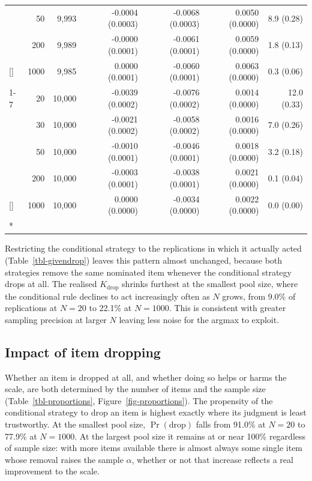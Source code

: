 \documentclass[
  nonatbib,
  authoryear,
  preprint]{elsarticle}
\begin{document}
\begin{longtable}[t]{lrrrrrr}
\nopagebreak
 & 50 & 9,993 & -0.0004 (0.0003) & -0.0068 (0.0003) & 0.0050 (0.0000) & 8.9 (0.28)\\
\nopagebreak
 & 200 & 9,989 & -0.0000 (0.0001) & -0.0061 (0.0001) & 0.0059 (0.0000) & 1.8 (0.13)\\
\nopagebreak
\multirow[t]{-4}{*}[\normalbaselineskip]{\raggedright\arraybackslash 20} & 1000 & 9,985 & 0.0000 (0.0001) & -0.0060 (0.0001) & 0.0063 (0.0000) & 0.3 (0.06)\\
\cmidrule{1-7}\pagebreak[0]
 & 20 & 10,000 & -0.0039 (0.0002) & -0.0076 (0.0002) & 0.0014 (0.0000) & 12.0 (0.33)\\
\nopagebreak
 & 30 & 10,000 & -0.0021 (0.0002) & -0.0058 (0.0002) & 0.0016 (0.0000) & 7.0 (0.26)\\
\nopagebreak
 & 50 & 10,000 & -0.0010 (0.0001) & -0.0046 (0.0001) & 0.0018 (0.0000) & 3.2 (0.18)\\
\nopagebreak
 & 200 & 10,000 & -0.0003 (0.0001) & -0.0038 (0.0001) & 0.0021 (0.0000) & 0.1 (0.04)\\
\nopagebreak
\multirow[t]{-4}{*}[\normalbaselineskip]{\raggedright\arraybackslash 40} & 1000 & 10,000 & 0.0000 (0.0000) & -0.0034 (0.0000) & 0.0022 (0.0000) & 0.0 (0.00)\\*

\end{longtable}

\endgroup{}

Restricting the conditional strategy to the replications in which it
actually acted (Table~\ref{tbl-givendrop}) leaves this pattern almost
unchanged, because both strategies remove the same nominated item
whenever the conditional strategy drops at all. The realised
\(K_{\text{drop}}\) shrinks furthest at the smallest pool size, where
the conditional rule declines to act increasingly often as \(N\) grows,
from 9.0\% of replications at \(N = 20\) to 22.1\% at \(N = 1000\). This
is consistent with greater sampling precision at larger \(N\) leaving
less noise for the argmax to exploit.

\subsection{Impact of item dropping}\label{impact-of-item-dropping}

Whether an item is dropped at all, and whether doing so helps or harms
the scale, are both determined by the number of items and the sample
size (Table~\ref{tbl-proportions}, Figure~\ref{fig-proportions}). The
propensity of the conditional strategy to drop an item is highest
exactly where its judgment is least trustworthy. At the smallest pool
size, \(\Pr(\text{drop})\) falls from 91.0\% at \(N = 20\) to 77.9\% at
\(N = 1000\). At the largest pool size it remains at or near 100\%
regardless of sample size: with more items available there is almost
always some single item whose removal raises the sample \(\alpha\),
whether or not that increase reflects a real improvement to the scale.
\end{document}
